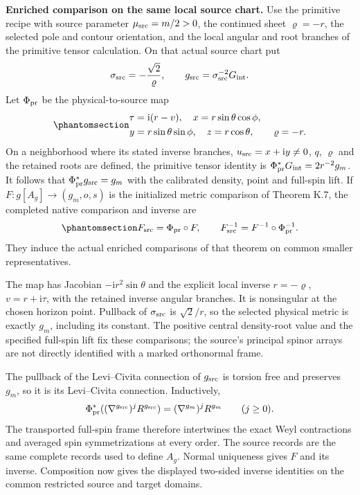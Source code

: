 \documentclass[
  english,
  11pt,
  reqno]{amsart}
\begin{document}
\textbf{Enriched comparison on the same local source chart.} Use the
primitive recipe with source parameter \(\mu_{\rm src}=m/2>0\), the
continued sheet \(\varrho=-r\), the selected pole and contour
orientation, and the local angular and root branches of the primitive
tensor calculation. On that actual source chart put \[
 \sigma_{\rm src}=-\frac{\sqrt2}{\varrho},\qquad
 g_{\rm src}=\sigma_{\rm src}^{-2}G_{\rm int}.
\] Let \(\Phi_{\rm pr}\) be the physical-to-source map
\begin{equation}\protect\phantomsection\label{eq:schw-bc-native-chart-map}{
 \begin{aligned}
 \tau&=\mathrm i(r-v),\quad x=r\sin\theta\cos\phi,\\
 y&=r\sin\theta\sin\phi,\quad z=r\cos\theta,\qquad\varrho=-r.
 \end{aligned}
}\end{equation} On a neighborhood where its stated inverse branches,
\(u_{\rm src}=x+\mathrm iy\ne0\), \(q\), \(\varrho\) and the retained
roots are defined, the primitive tensor identity is
\(\Phi_{\rm pr}^*G_{\rm int}=2r^{-2}g_m\). It follows that
\(\Phi_{\rm pr}^*g_{\rm src}=g_m\) with the calibrated density, point
and full-spin lift. If \(F:g[A_g]\to(g_m,o,s)\) is the initialized
metric comparison of Theorem K.7, the completed native comparison and
inverse are
\begin{equation}\protect\phantomsection\label{eq:schw-bc-native-generated-composite}{
 F_{\rm src}=\Phi_{\rm pr}\circ F,\qquad
 F_{\rm src}^{-1}=F^{-1}\circ\Phi_{\rm pr}^{-1}.
}\end{equation} They induce the actual enriched comparisons of that
theorem on common smaller representatives.

The map has Jacobian \(-\mathrm ir^2\sin\theta\) and the explicit local
inverse \(r=-\varrho\), \(v=r+\mathrm i\tau\), with the retained inverse
angular branches. It is nonsingular at the chosen horizon point.
Pullback of \(\sigma_{\rm src}\) is \(\sqrt2/r\), so the selected
physical metric is exactly \(g_m\), including its constant. The positive
central density-root value and the specified full-spin lift fix these
comparisons; the source's principal spinor arrays are not directly
identified with a marked orthonormal frame.

The pullback of the Levi--Civita connection of \(g_{\rm src}\) is
torsion free and preserves \(g_m\), so it is its Levi--Civita
connection. Inductively, \[
 \Phi_{\rm pr}^*((\nabla^{g_{\rm src}})^jR^{g_{\rm src}})
       =(\nabla^{g_m})^jR^{g_m}\qquad(j\ge0).
\] The transported full-spin frame therefore intertwines the exact Weyl
contractions and averaged spin symmetrizations at every order. The
source records are the same complete records used to define \(A_g\).
Normal uniqueness gives \(F\) and its inverse. Composition now gives the
displayed two-sided inverse identities on the common restricted source
and target domains.
\end{document}
